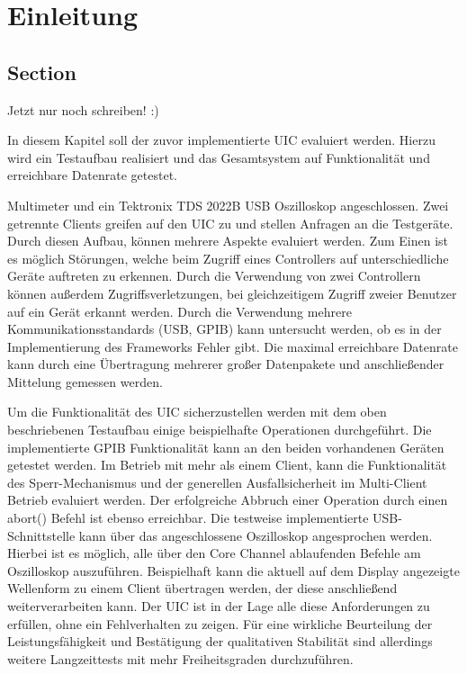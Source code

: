 \chapter{Einleitung} \label{cha:Einleitung}



\section{Section} \label{sec:Section}

Jetzt nur noch schreiben! :)


In diesem Kapitel soll der zuvor implementierte \ac{UIC} evaluiert werden. Hierzu wird ein Testaufbau realisiert und das Gesamtsystem auf Funktionalität und erreichbare Datenrate getestet.


 Multimeter und ein Tektronix TDS 2022B \ac{USB} Oszilloskop angeschlossen. Zwei getrennte Clients greifen auf den \ac{UIC} zu und stellen Anfragen an die Testgeräte. 
Durch diesen Aufbau, können mehrere Aspekte evaluiert werden. Zum Einen ist es möglich Störungen, welche beim Zugriff eines Controllers auf unterschiedliche Geräte auftreten zu erkennen. Durch die Verwendung von zwei Controllern können außerdem Zugriffsverletzungen, bei gleichzeitigem Zugriff zweier Benutzer auf ein Gerät erkannt werden. Durch die Verwendung mehrere Kommunikationsstandards (\ac{USB}, \ac{GPIB}) kann untersucht werden, ob es in der Implementierung des Frameworks Fehler gibt. Die maximal erreichbare Datenrate kann durch eine Übertragung mehrerer großer Datenpakete und anschließender Mittelung gemessen werden. 



	



Um die Funktionalität des \ac{UIC} sicherzustellen werden mit dem oben beschriebenen Testaufbau einige beispielhafte Operationen durchgeführt. 
Die implementierte GPIB Funktionalität kann an den beiden vorhandenen Geräten getestet werden. Im Betrieb mit mehr als einem Client, kann die Funktionalität des Sperr-Mechanismus und der generellen Ausfallsicherheit im Multi-Client Betrieb evaluiert werden. Der erfolgreiche Abbruch einer Operation durch einen abort() Befehl ist ebenso erreichbar. Die testweise implementierte USB-Schnittstelle kann über das angeschlossene Oszilloskop angesprochen werden. Hierbei ist es möglich, alle über den Core Channel ablaufenden Befehle am Oszilloskop auszuführen. Beispielhaft kann die aktuell auf dem Display angezeigte Wellenform zu einem Client übertragen werden, der diese anschließend weiterverarbeiten kann.
Der UIC ist in der Lage alle diese Anforderungen zu erfüllen, ohne ein Fehlverhalten zu zeigen. Für eine wirkliche Beurteilung der Leistungsfähigkeit und Bestätigung der qualitativen Stabilität sind allerdings weitere Langzeittests mit mehr Freiheitsgraden durchzuführen.



